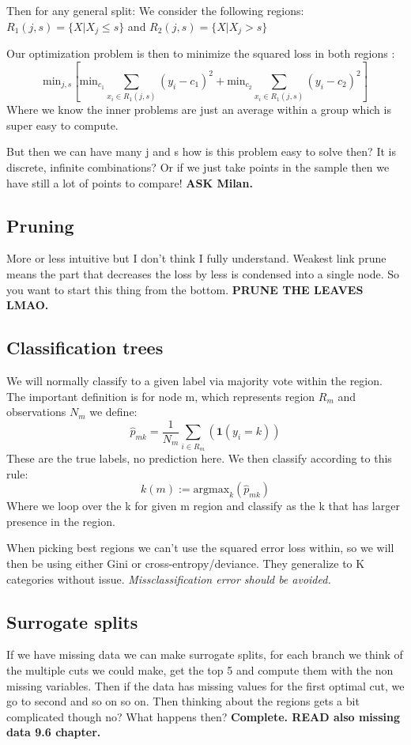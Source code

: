 \documentclass{article}
\begin{document}
Then for any general split:
We consider the following regions: $R_1(j,s) = \{ X| X_j \leq s \}$ and $R_2(j,s) = \{ X| X_j > s \}$

Our optimization problem is then to minimize the squared loss in both regions : 
$$ \textrm{min}_{j,s}[\textrm{min}_{c_1} \sum_{x_i \in R_1(j,s)}(y_i-c_1)^2 + \textrm{min}_{c_2} \sum_{x_i \in R_1(j,s)}(y_i-c_2)^2  ]$$
Where we know the inner problems are just an average within a group which is super easy to compute.

But then we can have many j and s how is this problem easy to solve then? It is discrete, infinite combinations? Or if we just take points in the sample then we have still a lot of points to compare! \textbf{ASK Milan.}

\subsection{Pruning}
More or less intuitive but I don't think I fully understand. Weakest link prune means the part that decreases the loss by less is condensed into a single node. So you want to start this thing from the bottom. \textbf{PRUNE THE LEAVES LMAO.}

\subsection{Classification trees}
We will normally classify to a given label via majority vote within the region.
The important definition is for node m, which represents region $R_m$ and observations $N_m$ we define: 
$$\hat{p}_{mk} = \frac{1}{N_m}\sum_{i \in R_m}(\textbf{1}(y_i = k))$$
These are the true labels, no prediction here.
We then classify according to this rule: $$k(m) := \textrm{argmax}_{k} (\hat{p}_{mk})$$
Where we loop over the k for given m region and classify as the k that has larger presence in the region.


When picking best regions we can't use the squared error loss within, so we will then be using either Gini or cross-entropy/deviance. They generalize to K categories without issue. \textit{ Missclassification error should be avoided.}  

\subsection{Surrogate splits}
If we have missing data we can make surrogate splits, for each branch we think of the multiple cuts we could make, get the top 5 and compute them with the non missing variables.
Then if the data has missing values for the first optimal cut, we go to second and so on so on. Then thinking about the regions gets a bit complicated though no? 
What happens then? \textbf{Complete. READ also missing data 9.6 chapter.}
\end{document}
